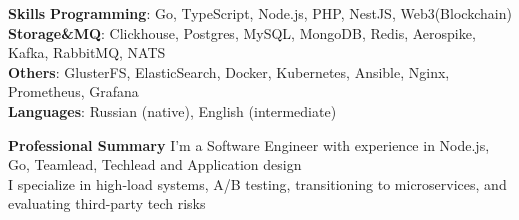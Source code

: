 \documentclass{resume} %
\begin{document}
\begin{rSection}{\textbf{Skills}}
       \textbf{Programming}: Go, TypeScript, Node.js, PHP, NestJS, Web3(Blockchain)
       \\ \textbf{Storage\&MQ}: Clickhouse, Postgres, MySQL, MongoDB, Redis, Aerospike, Kafka, RabbitMQ, NATS
       \\ \textbf{Others}: GlusterFS, ElasticSearch, Docker, Kubernetes, Ansible, Nginx, Prometheus, Grafana
       \\ \textbf{Languages}: Russian (native), English (intermediate)
\end{rSection}

\begin{rSection}{\textbf{Professional Summary}}
{
    I'm a Software Engineer with experience in Node.js, Go, Teamlead, Techlead and Application design
    \\ I specialize in high-load systems, A/B testing, transitioning to microservices, and evaluating third-party tech risks
}

\end{rSection}
\end{document}
